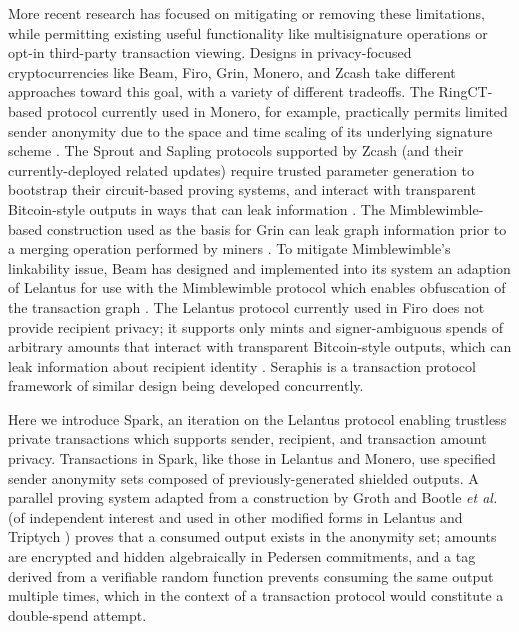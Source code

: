\documentclass{llncs}
\begin{document}
More recent research has focused on mitigating or removing these limitations, while permitting existing useful functionality like multisignature operations or opt-in third-party transaction viewing.
Designs in privacy-focused cryptocurrencies like Beam, Firo, Grin, Monero, and Zcash take different approaches toward this goal, with a variety of different tradeoffs.
The RingCT-based protocol currently used in Monero, for example, practically permits limited sender anonymity due to the space and time scaling of its underlying signature scheme \cite{ringct,clsag}.
The Sprout and Sapling protocols supported by Zcash \cite{zcash} (and their currently-deployed related updates) require trusted parameter generation to bootstrap their circuit-based proving systems, and interact with transparent Bitcoin-style outputs in ways that can leak information \cite{zcash_sprout,zcash_sapling}.
The Mimblewimble-based construction used as the basis for Grin can leak graph information prior to a merging operation performed by miners \cite{mw}.
To mitigate Mimblewimble's linkability issue, Beam has designed and implemented into its system an adaption of Lelantus for use with the Mimblewimble protocol which enables obfuscation of the transaction graph \cite{LMW}.
The Lelantus protocol currently used in Firo does not provide recipient privacy; it supports only mints and signer-ambiguous spends of arbitrary amounts that interact with transparent Bitcoin-style outputs, which can leak information about recipient identity \cite{lelantus}.
Seraphis \cite{seraphis} is a transaction protocol framework of similar design being developed concurrently.

Here we introduce Spark, an iteration on the Lelantus protocol enabling trustless private transactions which supports sender, recipient, and transaction amount privacy.
Transactions in Spark, like those in Lelantus and Monero, use specified sender anonymity sets composed of previously-generated shielded outputs.
A parallel proving system adapted from a construction by Groth and Bootle \textit{et al.} \cite{groth,bootle} (of independent interest and used in other modified forms in Lelantus\cite{lelantus} and Triptych \cite{triptych}) proves that a consumed output exists in the anonymity set; amounts are encrypted and hidden algebraically in Pedersen commitments, and a tag derived from a verifiable random function \cite{dodis,omniring} prevents consuming the same output multiple times, which in the context of a transaction protocol would constitute a double-spend attempt.
\end{document}
